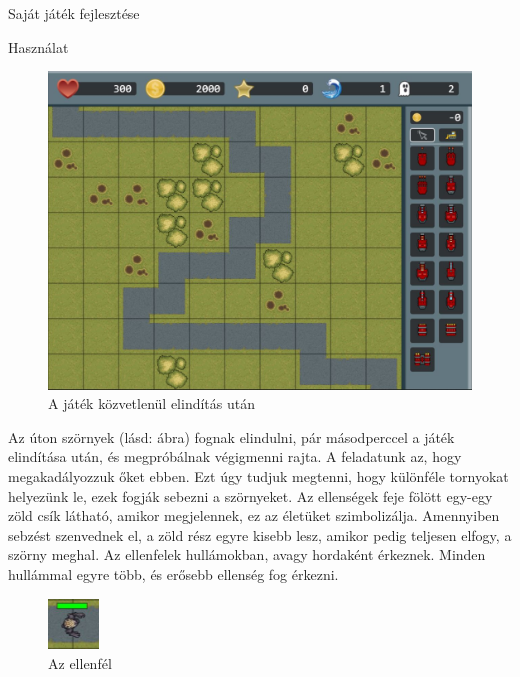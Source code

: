 \begin{MyChapter}{Saját játék fejlesztése}
\begin{MySection}{Használat}
		\begin{figure}[H]
			\centering
			\includegraphics[scale=0.45]{kepek/jatekHasznalat/game_scene}
			\caption{A játék közvetlenül elindítás után}
			\label{fig:jatekHasznalat:game_scene}
		\end{figure}
		
		Az úton szörnyek (lásd:  ábra) fognak elindulni, pár másodperccel a játék elindítása után, és megpróbálnak végigmenni rajta.
		A feladatunk az, hogy megakadályozzuk őket ebben. Ezt úgy tudjuk megtenni, hogy különféle tornyokat helyezünk le, ezek fogják sebezni a szörnyeket.
		Az ellenségek feje fölött egy-egy zöld csík látható, amikor megjelennek, ez az életüket szimbolizálja. Amennyiben sebzést szenvednek el, a zöld rész egyre kisebb lesz, amikor pedig teljesen elfogy, a szörny meghal. Az ellenfelek hullámokban, avagy hordaként érkeznek. Minden hullámmal egyre több, és erősebb ellenség fog érkezni.
		
		\begin{figure}[H]
			\centering
			\includegraphics[width=0.12\textwidth]{kepek/jatekHasznalat/szorny}
			\caption{Az ellenfél}
			\label{fig:jatekHasznalat:szorny}
		\end{figure}
		

\end{MySection}
\end{MyChapter}
